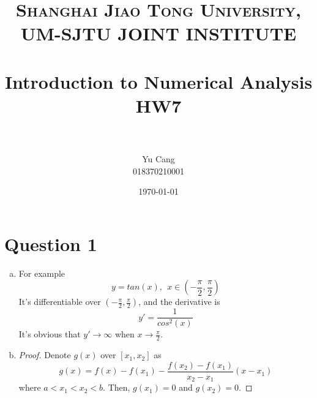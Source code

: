 \documentclass[paper=a4, fontsize=11pt]{scrartcl} %
\title{	
\normalfont \normalsize 
\textsc{Shanghai Jiao Tong University, UM-SJTU JOINT INSTITUTE} \\ [25pt] %
\horrule{0.5pt} \\[0.4cm] %
\huge Introduction to Numerical Analysis \\ HW7 \\ %
\horrule{2pt} \\[0.5cm] %
}
\author{Yu Cang \\ 018370210001} %
\date{\normalsize \today} %
\numberwithin{equation}{section} %
\numberwithin{figure}{section} %
\numberwithin{table}{section} %
\begin{document}
\maketitle %

\section{Question 1}
	\begin{enumerate}[(a)]
		\item 
			For example
			\begin{equation}
				y = tan(x), \ \ x\in (-\frac{\pi}{2}, \frac{\pi}{2})
			\end{equation}
			It's differentiable over $(-\frac{\pi}{2}, \frac{\pi}{2})$, and the derivative is 
			\begin{equation}
				y' = \frac{1}{cos^2(x)}
			\end{equation}
			It's obvious that $y' \rightarrow \infty$ when $x \rightarrow \frac{\pi}{2}$.
		\item 
			\begin{proof}
				Denote $g(x)$ over $[x_1, x_2]$ as
				\begin{equation}
					g(x) = f(x) - f(x_1) - \frac{f(x_2)-f(x_1)}{x_2-x_1}(x-x_1) 
				\end{equation}
				where $a< x_1 < x_2 < b$. Then, $g(x_1) = 0$ and $g(x_2)=0$.
				

\end{proof}
\end{enumerate}
\end{document}
